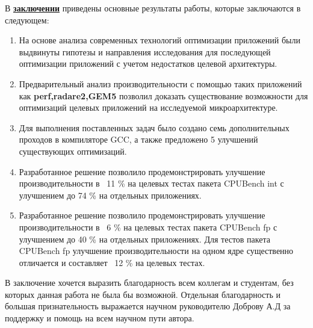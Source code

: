 
\FloatBarrier
{}                                  %
В \underline{\textbf{заключении}} приведены основные результаты работы, которые заключаются в следующем:

\begin{enumerate}
	\item На основе анализа современных технологий оптимизации приложений были выдвинуты гипотезы и направления исследования для последующей оптимизации приложений с учетом недостатков целевой архитектуры.
	\item Предварительный анализ производительности с помощью таких приложений как \textbf{perf,radare2,GEM5} позволил доказать существование возможности  для оптимизаций целевых приложений на исследуемой микроархитектуре. 
	\item Для выполнения поставленных задач было создано семь дополнительных проходов в компиляторе GCC, а также предложено 5 улучшений существующих оптимизаций.
	\item Разработанное решение позволило продемонстрировать улучшение производительности в ~11 \% на целевых тестах пакета CPUBench int  с улучшением до 74 \% на отдельных приложениях. 
	\item Разработанное решение позволило продемонстрировать улучшение производительности в ~6 \% на целевых тестах пакета CPUBench fp  с улучшением до 40 \% на отдельных приложениях. Для тестов пакета CPUBench fp улучшение производительности на  одном ядре существенно отличается и составляет ~12 \% на целевых тестах.
\end{enumerate}

В заключение хочется выразить благодарность всем коллегам и студентам, без которых данная работа не была бы возможной. Отдельная благодарность и большая признательность выражается научном руководителю Доброву А.Д за поддержку и помощь на всем научном пути автора.

